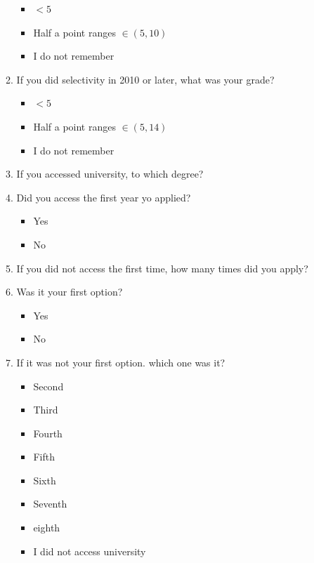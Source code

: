 \documentclass[12pt]{article}
\begin{document}
\begin{enumerate}
\begin{enumerate}
\begin{itemize}
\item $<5$
\item Half a point ranges $\in (5, 10)$
\item I do not remember
\end{itemize}
\item If you did selectivity in 2010 or later, what was your grade?
\begin{itemize}
\item $<5$
\item Half a point ranges $\in (5, 14)$
\item I do not remember
\end{itemize}
\item If you accessed university, to which degree?
\item Did you access the first year yo applied?
\begin{itemize}
\item Yes
\item No
\end{itemize}
\item If you did not access the first time, how many times did you apply?
\item Was it your first option?
\begin{itemize}
\item Yes
\item No
\end{itemize}
\item If it was not your first option. which one was it?
\begin{itemize}
\item Second
\item Third
\item Fourth
\item Fifth
\item Sixth
\item Seventh
\item eighth
\item I did not access university
\end{itemize}
\end{enumerate}
\end{enumerate}
%
\end{document}
